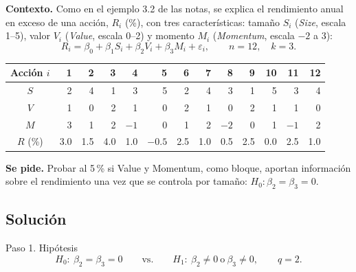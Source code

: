 \documentclass[11pt,letterpaper]{article}
\begin{document}
\textbf{Contexto.} Como en el ejemplo 3.2 de las notas, se explica el rendimiento anual en exceso de
una acción, $R_i$ (\%), con tres características: tamaño $S_i$ (\emph{Size}, escala 1--5), valor $V_i$
(\emph{Value}, escala 0--2) y momento $M_i$ (\emph{Momentum}, escala $-2$ a 3):
\[
R_i=\beta_0+\beta_1S_i+\beta_2V_i+\beta_3M_i+\varepsilon_i,\qquad n=12,\quad k=3 .
\]
\begin{center}
\begin{tabular}{c*{12}{r}}
\toprule
Acción $i$ & 1 & 2 & 3 & 4 & 5 & 6 & 7 & 8 & 9 & 10 & 11 & 12\\
\midrule
$S$ & 2 & 4 & 1 & 3 & 5 & 2 & 4 & 3 & 1 & 5 & 3 & 4\\
$V$ & 1 & 0 & 2 & 1 & 0 & 2 & 1 & 0 & 2 & 1 & 1 & 0\\
$M$ & 3 & 1 & 2 & $-1$ & 0 & 1 & 2 & $-2$ & 0 & 1 & $-1$ & 2\\
$R$ (\%) & 3.0 & 1.5 & 4.0 & 1.0 & $-0.5$ & 2.5 & 1.0 & 0.5 & 2.5 & 0.0 & 2.5 & 1.0\\
\bottomrule
\end{tabular}
\end{center}

\textbf{Se pide.} Probar al 5\,\% si Value y Momentum, como bloque, aportan información sobre el
rendimiento una vez que se controla por tamaño: $H_0:\beta_2=\beta_3=0$.

\subsection*{Solución}

\begin{paso}{Paso 1. Hipótesis}
\[
H_0:\ \beta_2=\beta_3=0\qquad\text{vs.}\qquad H_1:\ \beta_2\neq0\ \text{o}\ \beta_3\neq0,
\qquad q=2 .
\]
\end{paso}
\end{document}
